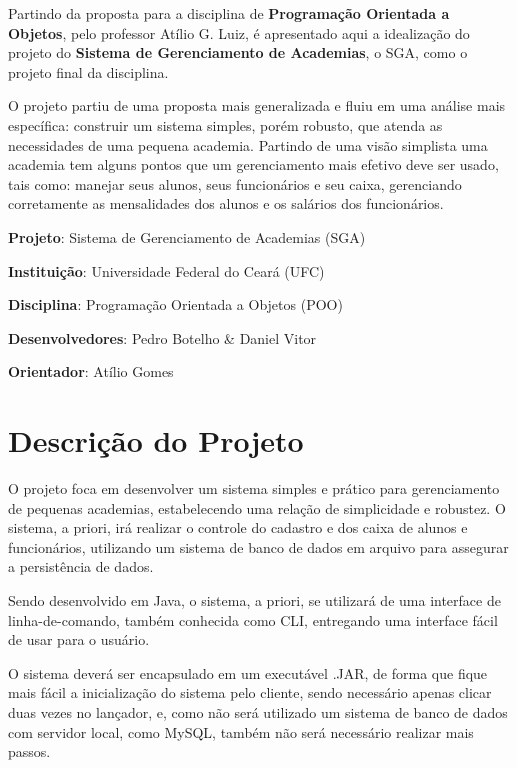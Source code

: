 \documentclass[12pt]{article}
\begin{document}
Partindo da proposta para a disciplina de \textbf{Programação Orientada a Objetos}, pelo professor Atílio G. Luiz, é apresentado aqui a idealização do projeto do \textbf{Sistema de Gerenciamento de Academias}, o SGA, como o projeto final da disciplina. 

O projeto partiu de uma proposta mais generalizada e fluiu em uma análise mais específica: construir um sistema simples, porém robusto, que atenda as necessidades de uma pequena academia. Partindo de uma visão simplista uma academia tem alguns pontos que um gerenciamento mais efetivo deve ser usado, tais como: manejar seus alunos, seus funcionários e seu caixa, gerenciando corretamente as mensalidades dos alunos e os salários dos funcionários.

\begin{flushleft}

\textbf{Projeto}: Sistema de Gerenciamento de Academias (SGA)

\textbf{Instituição}: Universidade Federal do Ceará (UFC)

\textbf{Disciplina}: Programação Orientada a Objetos (POO)

\textbf{Desenvolvedores}: Pedro Botelho \& Daniel Vitor

\textbf{Orientador}: Atílio Gomes
\end{flushleft}

\newpage
\section{Descrição do Projeto}

O projeto foca em desenvolver um sistema simples e prático para gerenciamento de pequenas academias, estabelecendo uma relação de simplicidade e robustez. O sistema, a priori, irá realizar o controle do cadastro e dos caixa de alunos e funcionários, utilizando um sistema de banco de dados em arquivo para assegurar a persistência de dados.

Sendo desenvolvido em Java, o sistema, a priori, se utilizará de uma interface de linha-de-comando, também conhecida como CLI, entregando uma interface fácil de usar para o usuário. 

O sistema deverá ser encapsulado em um executável .JAR, de forma que fique mais fácil a inicialização do sistema pelo cliente, sendo necessário apenas clicar duas vezes no lançador, e, como não será utilizado um sistema de banco de dados com servidor local, como MySQL, também não será necessário realizar mais passos.
\end{document}
